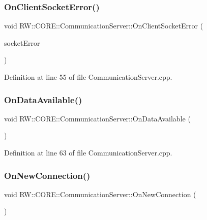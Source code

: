 \subsubsection{\texorpdfstring{On\+Client\+Socket\+Error()}{OnClientSocketError()}}
{\footnotesize\ttfamily void R\+W\+::\+C\+O\+R\+E\+::\+Communication\+Server\+::\+On\+Client\+Socket\+Error (\begin{DoxyParamCaption}\item[{Q\+Local\+Socket\+::\+Local\+Socket\+Error}]{socket\+Error }\end{DoxyParamCaption})\hspace{0.3cm}{\ttfamily [private]}}



Definition at line 55 of file Communication\+Server.\+cpp.

\hypertarget{class_r_w_1_1_c_o_r_e_1_1_communication_server_abdbb4f3eeced8215b50e75fdd93d62af}{}\label{class_r_w_1_1_c_o_r_e_1_1_communication_server_abdbb4f3eeced8215b50e75fdd93d62af} 
\subsubsection{\texorpdfstring{On\+Data\+Available()}{OnDataAvailable()}}
{\footnotesize\ttfamily void R\+W\+::\+C\+O\+R\+E\+::\+Communication\+Server\+::\+On\+Data\+Available (\begin{DoxyParamCaption}{ }\end{DoxyParamCaption})\hspace{0.3cm}{\ttfamily [private]}}



Definition at line 63 of file Communication\+Server.\+cpp.

\hypertarget{class_r_w_1_1_c_o_r_e_1_1_communication_server_ad26258ff2481b68cec6d80e78e0a5c7d}{}\label{class_r_w_1_1_c_o_r_e_1_1_communication_server_ad26258ff2481b68cec6d80e78e0a5c7d} 
\subsubsection{\texorpdfstring{On\+New\+Connection()}{OnNewConnection()}}
{\footnotesize\ttfamily void R\+W\+::\+C\+O\+R\+E\+::\+Communication\+Server\+::\+On\+New\+Connection (\begin{DoxyParamCaption}{ }\end{DoxyParamCaption})\hspace{0.3cm}{\ttfamily [private]}}



